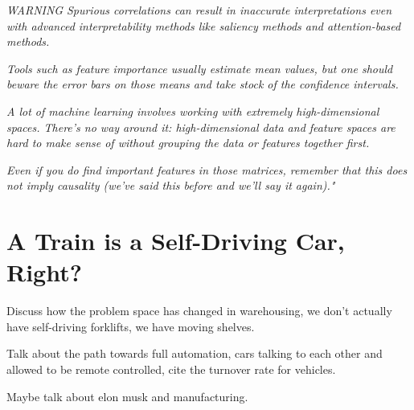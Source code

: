 \textit{WARNING}
\textit{Spurious correlations can result in inaccurate interpretations even with advanced interpretability methods like saliency methods and attention-based methods.}

\textit{Tools such as feature importance usually estimate mean values, but one should beware the error bars on those means and take stock of the confidence intervals.}

\textit{A lot of machine learning involves working with extremely high-dimensional spaces. There's no way around it: high-dimensional data and feature spaces are hard to make sense of without grouping the data or features together first.}

\textit{Even if you do find important features in those matrices, remember that this does not imply causality (we've said this before and we'll say it again)."} \cite{trustworthyml}

\section{A Train is a Self-Driving Car, Right?}

Discuss how the problem space has changed in warehousing, we don't actually have self-driving forklifts, we have moving shelves.

Talk about the path towards full automation, cars talking to each other and allowed to be remote controlled, cite the turnover rate for vehicles.

Maybe talk about elon musk and manufacturing.

